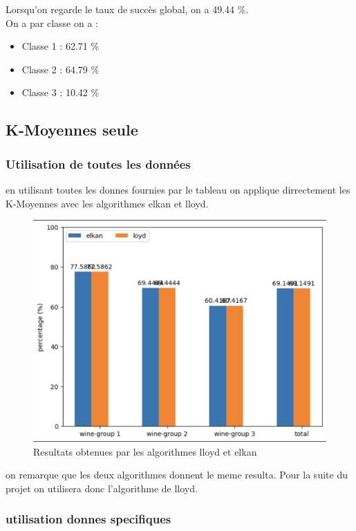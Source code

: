 \documentclass[a4paper,12pt]{article}
\begin{document}
Lorsqu'on regarde le taux de succès global, on a 49.44 \%.\\

On a par classe on a :
\begin{itemize}
\item Classe 1 : 62.71 \%
\item Classe 2 : 64.79 \%
\item Classe 3 : 10.42 \%
\end{itemize}

\subsection{K-Moyennes seule}
\subsubsection{Utilisation de toutes les données}
en utilisant toutes les donnes fournies par le tableau on applique dirrectement les K-Moyennes avec les algorithmes elkan et lloyd.

\begin{figure}[h!] %
   \centering
   \includegraphics[width=1\textwidth]{comparaison_algos.png} %
   \caption{Resultats obtenues par les algorithmes lloyd et elkan}
   \label{comparaison_algos.png} %
\end{figure}

on remarque que les deux algorithmes donnent le meme resulta. Pour la suite du projet on utilisera donc l'algorithme de lloyd.
\newpage
\subsubsection{utilisation donnes specifiques}
\end{document}

